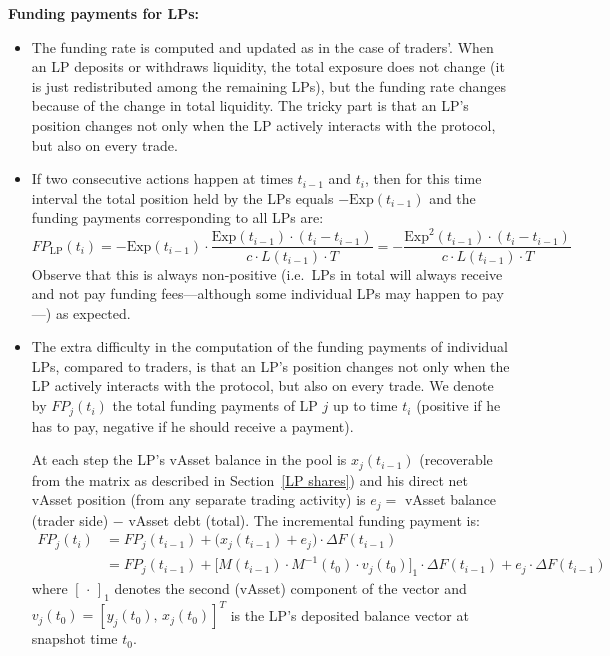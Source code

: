 \documentclass{article}
\begin{document}
\medskip
\noindent\textbf{Funding payments for LPs:}
\begin{itemize}

\item The funding rate is computed and updated as in the case of traders'. When an LP
      deposits or withdraws liquidity, the total exposure does not change (it is just
      redistributed among the remaining LPs), but the funding rate changes because of the
      change in total liquidity. The tricky part is that an LP's position changes not only
      when the LP actively interacts with the protocol, but also on every trade.

\item If two consecutive actions happen at times $t_{i-1}$ and $t_i$, then for this time
      interval the total position held by the LPs equals $-\mathrm{Exp}(t_{i-1})$ and the
      funding payments corresponding to all LPs are:
\begin{equation}
FP_{\mathrm{LP}}(t_i) = -\mathrm{Exp}(t_{i-1}) \cdot \frac{\mathrm{Exp}(t_{i-1}) \cdot (t_i - t_{i-1})}{c \cdot L(t_{i-1}) \cdot T}
= -\frac{\mathrm{Exp}^2(t_{i-1}) \cdot (t_i - t_{i-1})}{c \cdot L(t_{i-1}) \cdot T}
\end{equation}
Observe that this is always non-positive (i.e.\ LPs in total will always receive and not
pay funding fees---although some individual LPs may happen to pay---) as expected.

\item The extra difficulty in the computation of the funding payments of individual LPs,
      compared to traders, is that an LP's position changes not only when the LP actively
      interacts with the protocol, but also on every trade. We denote by $FP_j(t_i)$ the
      total funding payments of LP $j$ up to time $t_i$ (positive if he has to pay,
      negative if he should receive a payment).

      At each step the LP's vAsset balance in the pool is $x_j(t_{i-1})$ (recoverable from
      the matrix as described in Section~\ref{LP shares}) and his direct net vAsset
      position (from any separate trading activity) is $e_j = $ vAsset balance
      (trader side) $-$ vAsset debt (total). The incremental funding payment is:
\begin{align}
FP_j(t_i) &= FP_j(t_{i-1}) + \bigl(x_j(t_{i-1}) + e_j\bigr) \cdot \Delta F(t_{i-1})\\
           &= FP_j(t_{i-1}) + \bigl[M(t_{i-1}) \cdot M^{-1}(t_0) \cdot v_j(t_0)\bigr]_1 \cdot \Delta F(t_{i-1})
              + e_j \cdot \Delta F(t_{i-1})
\end{align}
where $[\,\cdot\,]_1$ denotes the second (vAsset) component of the vector and
$v_j(t_0) = [y_j(t_0),\, x_j(t_0)]^T$ is the LP's deposited balance vector at snapshot
time $t_0$.


\end{itemize}
\end{document}
